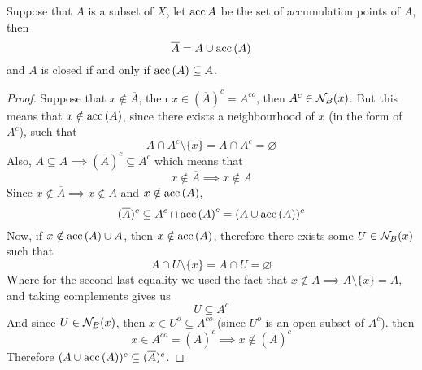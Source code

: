 \documentclass[../../main.tex]{subfiles}
\begin{document}
\begin{wts}
Suppose that $A$ is a subset of $X$, let $\operatorname{acc}{A}$ be the set of accumulation points of $A$, then
\begin{equation}
    \overline{A}=A\cup\operatorname{acc}{(A)}
\end{equation}
and $A$ is closed if and only if $\operatorname{acc}{(A)}\subseteq A$.
\end{wts}
\begin{proof}
Suppose that $x\notin \overline{A}$, then $x\in (\overline{A})^c=A^{co}$, then $A^c\in\mathcal{N}_B({x})$. But this means that $x\notin\operatorname{acc}{(A)}$, since there exists a neighbourhood of $x$ (in the form of $A^c$), such that 
\[
A\cap A^c\setminus\{x\}=A\cap A^c=\varnothing
\]
Also, $A\subseteq \overline{A}\implies (\overline{A})^c\subseteq A^c$ which means that
\[
x\notin \overline{A}\implies x\notin A
\]
Since $x\notin \overline{A}\implies x\notin A$ and $x\notin \operatorname{acc}{(A)}$,
\[
(\overline{A})^c\subseteq A^c\cap \operatorname{acc}{(A)}^c = (A\cup \operatorname{acc}{(A)})^c
\]
Now, if $x\notin \operatorname{acc}{(A)}\cup A$, then $x\notin\operatorname{acc}{(A)}$, therefore there exists some $U\in\mathcal{N}_B({x})$ such that 
\[
A\cap U\setminus\{x\} = A\cap U=\varnothing
\]
Where for the second last equality we used the fact that $x\notin A\implies A\setminus\{x\}=A$, and taking complements gives us
\[
U\subseteq A^c
\]
And since $U\in\mathcal{N}_B({x})$, then $x\in U^o\subseteq A^{co}$ (since $U^o$ is an open subset of $A^c$). then
\[
x\in A^{co} = (\overline{A})^c\implies x\notin (\overline{A})^c
\]
Therefore $(A\cup\operatorname{acc}{(A)})^c\subseteq (\overline{A})^c$.
\end{proof}
\end{document}
